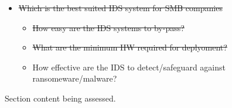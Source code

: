 \begin{notes}

    \begin{itemize}
        \item \sout{Which is the best suited IDS system for SMB companies}
        \begin{itemize}
            \item \sout{How easy are the IDS systems to by-pass?}
            \item \sout{What are the minimum HW required for deplyoment?}
            \item How effective are the IDS to detect/safeguard against ransomeware/malware?
        \end{itemize}

    \end{itemize}
    
    
Section content being assessed.
    
\end{notes}